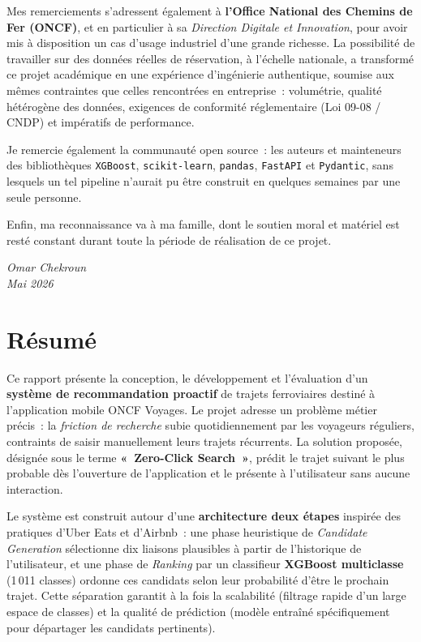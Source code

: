 \documentclass[11pt, a4paper]{article}
\begin{document}
Mes remerciements s'adressent également à \textbf{l'Office National des Chemins
de Fer (ONCF)}, et en particulier à sa \textit{Direction Digitale et
Innovation}, pour avoir mis à disposition un cas d'usage industriel d'une
grande richesse. La possibilité de travailler sur des données réelles de
réservation, à l'échelle nationale, a transformé ce projet académique en une
expérience d'ingénierie authentique, soumise aux mêmes contraintes que celles
rencontrées en entreprise~: volumétrie, qualité hétérogène des données, exigences
de conformité réglementaire (Loi 09-08 / CNDP) et impératifs de performance.

Je remercie également la communauté open source~: les auteurs et mainteneurs des
bibliothèques \texttt{XGBoost}, \texttt{scikit-learn}, \texttt{pandas},
\texttt{FastAPI} et \texttt{Pydantic}, sans lesquels un tel pipeline n'aurait
pu être construit en quelques semaines par une seule personne.

Enfin, ma reconnaissance va à ma famille, dont le soutien moral et matériel
est resté constant durant toute la période de réalisation de ce projet.

\vspace{1cm}
\hfill\textit{Omar Chekroun}\\
\hfill\textit{Mai 2026}

\newpage
\section*{Résumé}

Ce rapport présente la conception, le développement et l'évaluation d'un
\textbf{système de recommandation proactif} de trajets ferroviaires destiné à
l'application mobile ONCF Voyages. Le projet adresse un problème métier
précis~: la \textit{friction de recherche} subie quotidiennement par les
voyageurs réguliers, contraints de saisir manuellement leurs trajets
récurrents. La solution proposée, désignée sous le terme
\textbf{«~Zero-Click Search~»}, prédit le trajet suivant le plus probable
dès l'ouverture de l'application et le présente à l'utilisateur sans aucune
interaction.

Le système est construit autour d'une \textbf{architecture deux étapes}
inspirée des pratiques d'Uber Eats et d'Airbnb~: une phase heuristique de
\textit{Candidate Generation} sélectionne dix liaisons plausibles à partir
de l'historique de l'utilisateur, et une phase de \textit{Ranking} par un
classifieur \textbf{XGBoost multiclasse} (1\,011 classes) ordonne ces candidats
selon leur probabilité d'être le prochain trajet. Cette séparation garantit
à la fois la scalabilité (filtrage rapide d'un large espace de classes) et la
qualité de prédiction (modèle entraîné spécifiquement pour départager les
candidats pertinents).
\end{document}
